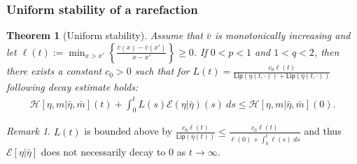 \documentclass[10pt, letterpaper]{article}
\def\E{{\mathcal{E}}}
\def\H{{\mathcal{H}}}
\def\Lip{{\textsf{Lip}}}
\newtheorem{theorem}{Theorem}
\theoremstyle{definition}
\theoremstyle{remark}
\newtheorem{remark}[subsubsection]{Remark}
\begin{document}
\subsubsection{Uniform stability of a rarefaction}
\begin{theorem}[Uniform stability]
    Assume that $\bar{{v}}$ is monotonically increasing and let $\displaystyle\ell(t):=\min_{x>x'} \left\{ \frac{\bar{v}(x) - \bar{v}(x')}{x-x'}\right\}\ge 0$. If $0 < p < 1$ and $1 < q < 2$, then there exists a constant $c_0>0$ such that for $L(t) = \frac{c_0\ell(t)}{\Lip(\eta(t,\cdot)) + \Lip(\bar\eta(t,\cdot))}$ following decay estimate holds:
\begin{align} \label{decay}
 \H[\eta,m|\bar\eta,\bar{m}](t) + \int_{0}^t L(s)\E(\eta|\bar\eta)(s) \:ds \le \H[\eta,m|\bar\eta,\bar{m}](0).  
\end{align}
\end{theorem}
\begin{remark}
$L(t)$ is bounded above by
$\displaystyle\frac{c_0 \ell(t)}{\Lip(\bar\eta(t))} \le \frac{c_0\ell(t)}{ \ell(0) + \int_0^t \ell(s)\:ds}$
and thus $\E[\eta|\bar\eta]$ does not necessarily decay to $0$ as $t \rightarrow \infty$.
\end{remark}
\end{document}
